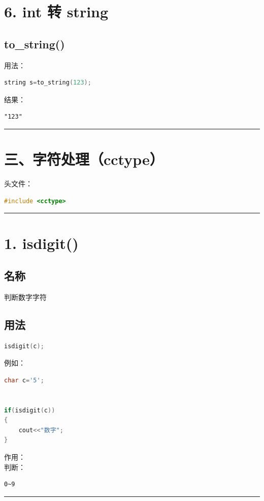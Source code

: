 \documentclass[9pt,twocolumn]{extarticle}
\begin{document}
\section{6. int 转 string}

\subsection{to\_string()}
用法：
\begin{lstlisting}[language=C++]
string s=to_string(123);
\end{lstlisting}
结果：
\begin{lstlisting}
"123"
\end{lstlisting}

\noindent\rule{\linewidth}{0.4pt}

\section{三、字符处理（cctype）}

头文件：
\begin{lstlisting}[language=C++]
#include <cctype>
\end{lstlisting}

\noindent\rule{\linewidth}{0.4pt}

\section{1. isdigit()}

\subsection{名称}
判断数字字符

\subsection{用法}
\begin{lstlisting}[language=C++]
isdigit(c);
\end{lstlisting}
例如：
\begin{lstlisting}[language=C++]
char c='5';


if(isdigit(c))
{
    cout<<"数字";
}
\end{lstlisting}
作用：\\
判断：
\begin{lstlisting}
0~9
\end{lstlisting}

\noindent\rule{\linewidth}{0.4pt}
\end{document}
